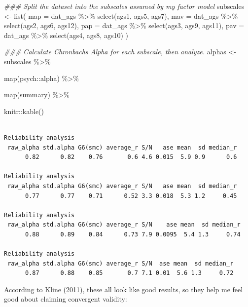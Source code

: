 \documentclass[
  letterpaper,
  DIV=11,
  numbers=noendperiod]{scrreprt}
\newenvironment{Shaded}{\begin{snugshade}}{\end{snugshade}}
\newcommand{\AttributeTok}[1]{\textcolor[rgb]{0.40,0.45,0.13}{#1}}
\newcommand{\DocumentationTok}[1]{\textcolor[rgb]{0.37,0.37,0.37}{\textit{#1}}}
\newcommand{\FunctionTok}[1]{\textcolor[rgb]{0.28,0.35,0.67}{#1}}
\newcommand{\NormalTok}[1]{\textcolor[rgb]{0.00,0.23,0.31}{#1}}
\newcommand{\OtherTok}[1]{\textcolor[rgb]{0.00,0.23,0.31}{#1}}
\newcommand{\SpecialCharTok}[1]{\textcolor[rgb]{0.37,0.37,0.37}{#1}}
\begin{document}
\begin{Shaded}
\begin{Highlighting}[]
\DocumentationTok{\#\#\# Split the dataset into the subscales assumed by my factor model}
\NormalTok{subscales }\OtherTok{\textless{}{-}} \FunctionTok{list}\NormalTok{(}
  \AttributeTok{map =}\NormalTok{ dat\_ags }\SpecialCharTok{\%\textgreater{}\%} \FunctionTok{select}\NormalTok{(ags1, ags5, ags7),}
  \AttributeTok{mav =}\NormalTok{ dat\_ags }\SpecialCharTok{\%\textgreater{}\%} \FunctionTok{select}\NormalTok{(ags2, ags6, ags12),}
  \AttributeTok{pap =}\NormalTok{ dat\_ags }\SpecialCharTok{\%\textgreater{}\%} \FunctionTok{select}\NormalTok{(ags3, ags9, ags11),}
  \AttributeTok{pav =}\NormalTok{ dat\_ags }\SpecialCharTok{\%\textgreater{}\%} \FunctionTok{select}\NormalTok{(ags4, ags8, ags10)}
\NormalTok{)}

\DocumentationTok{\#\#\# Calculate Chronbach\textquotesingle{}s Alpha for each subscale, then analyze.}
\NormalTok{alphas }\OtherTok{\textless{}{-}}\NormalTok{ subscales }\SpecialCharTok{\%\textgreater{}\%} 
  
  \FunctionTok{map}\NormalTok{(psych}\SpecialCharTok{::}\NormalTok{alpha) }\SpecialCharTok{\%\textgreater{}\%} 
  
  \FunctionTok{map}\NormalTok{(summary) }\SpecialCharTok{\%\textgreater{}\%} 
  
\NormalTok{  knitr}\SpecialCharTok{::}\FunctionTok{kable}\NormalTok{() }
\end{Highlighting}
\end{Shaded}

\begin{verbatim}

Reliability analysis   
 raw_alpha std.alpha G6(smc) average_r S/N   ase mean  sd median_r
      0.82      0.82    0.76       0.6 4.6 0.015  5.9 0.9      0.6

Reliability analysis   
 raw_alpha std.alpha G6(smc) average_r S/N   ase mean  sd median_r
      0.77      0.77    0.71      0.52 3.3 0.018  5.3 1.2     0.45

Reliability analysis   
 raw_alpha std.alpha G6(smc) average_r S/N    ase mean  sd median_r
      0.88      0.89    0.84      0.73 7.9 0.0095  5.4 1.3     0.74

Reliability analysis   
 raw_alpha std.alpha G6(smc) average_r S/N  ase mean  sd median_r
      0.87      0.88    0.85       0.7 7.1 0.01  5.6 1.3     0.72
\end{verbatim}

According to Kline (2011), these all look like good results, so they
help me feel good about claiming convergent validity:
\end{document}
